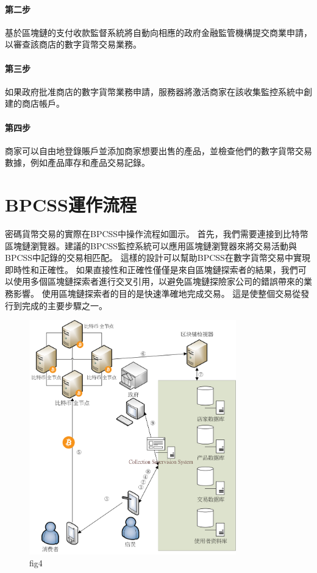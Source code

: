 		\paragraph{第二步}基於區塊鏈的支付收款監督系統將自動向相應的政府金融監管機構提交商業申請，以審查該商店的數字貨幣交易業務。
		\paragraph{第三步}如果政府批准商店的數字貨幣業務申請，服務器將激活商家在該收集監控系統中創建的商店帳戶。
		\paragraph{第四步}商家可以自由地登錄賬戶並添加商家想要出售的產品，並檢查他們的數字貨幣交易數據，例如產品庫存和產品交易記錄。

	\section{BPCSS運作流程}
	密碼貨幣交易的實際在BPCSS中操作流程如圖示。 首先，我們需要連接到比特幣區塊鏈瀏覽器。建議的BPCSS監控系統可以應用區塊鏈瀏覽器來將交易活動與BPCSS中記錄的交易相匹配。 這樣的設計可以幫助BPCSS在數字貨幣交易中實現即時性和正確性。 如果直接性和正確性僅僅是來自區塊鏈探索者的結果，我們可以使用多個區塊鏈探索者進行交叉引用，以避免區塊鏈探險家公司的錯誤帶來的業務影響。 使用區塊鏈探索者的目的是快速準確地完成交易。 這是使整個交易從發行到完成的主要步驟之一。
	
	\begin{figure}[h]
		\centering
		\includegraphics[width = 0.8\textwidth]{fig4.png}
		\caption{fig4}\label{fig4}
	\end{figure}

